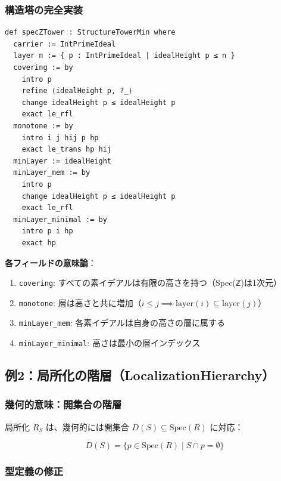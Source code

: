\documentclass{ltjsarticle}
\begin{document}
\subsubsection{構造塔の完全実装}

\begin{lstlisting}[caption=specZTowerの定義]
def specZTower : StructureTowerMin where
  carrier := IntPrimeIdeal
  layer n := { p : IntPrimeIdeal | idealHeight p ≤ n }
  covering := by
    intro p
    refine ⟨idealHeight p, ?_⟩
    change idealHeight p ≤ idealHeight p
    exact le_rfl
  monotone := by
    intro i j hij p hp
    exact le_trans hp hij
  minLayer := idealHeight
  minLayer_mem := by
    intro p
    change idealHeight p ≤ idealHeight p
    exact le_rfl
  minLayer_minimal := by
    intro p i hp
    exact hp
\end{lstlisting}

\textbf{各フィールドの意味論}：

\begin{enumerate}
\item \texttt{covering}: すべての素イデアルは有限の高さを持つ（Spec(ℤ)は1次元）
\item \texttt{monotone}: 層は高さと共に増加（$i \le j \implies \text{layer}(i) \subseteq \text{layer}(j)$）
\item \texttt{minLayer\_mem}: 各素イデアルは自身の高さの層に属する
\item \texttt{minLayer\_minimal}: 高さは最小の層インデックス
\end{enumerate}

\subsection{例2：局所化の階層（LocalizationHierarchy）}

\subsubsection{幾何的意味：開集合の階層}

局所化 $R_S$ は、幾何的には開集合 $D(S) \subseteq \text{Spec}(R)$ に対応：

\begin{equation}
D(S) = \{p \in \text{Spec}(R) \mid S \cap p = \emptyset\}
\end{equation}

\subsubsection{型定義の修正}
\end{document}
